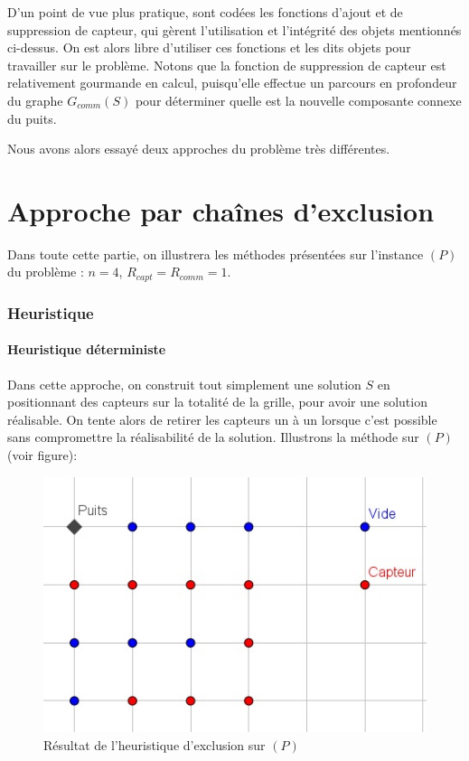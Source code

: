 \documentclass[12pt,a4paper]{article}
\begin{document}
D'un point de vue plus pratique, sont codées les fonctions d'ajout et de suppression de capteur, qui gèrent l'utilisation et l'intégrité des objets mentionnés ci-dessus. On est alors libre d'utiliser ces fonctions et les dits objets pour travailler sur le problème. Notons que la fonction de suppression de capteur est relativement gourmande en calcul, puisqu'elle effectue un parcours en profondeur du graphe $G_{comm}(S)$ pour déterminer quelle est la nouvelle composante connexe du puits.



Nous avons alors essayé deux approches du problème très différentes.

\part{Approche par chaînes d'exclusion}
Dans toute cette partie, on illustrera les méthodes présentées sur l'instance $(P)$ du problème : $n=4$, $R_{capt}=R_{comm}=1$.
\section{Heuristique}
\subsection {Heuristique déterministe}
Dans cette approche, on construit tout simplement une solution $S$ en positionnant des capteurs sur la totalité de la grille, pour avoir une solution réalisable. On tente alors de retirer les capteurs un à un lorsque c'est possible sans compromettre la réalisabilité de la solution.
Illustrons la méthode sur $(P)$ (voir figure): 
\begin{figure}[h]
\center
\includegraphics[scale=1]{Images/4_1_1_naif.jpg}
\caption{Résultat de l'heuristique d'exclusion sur $(P)$}
\end{figure}
\end{document}
